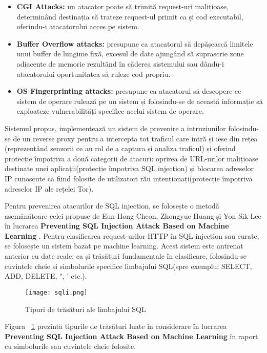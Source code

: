 \begin{itemize}
	\item \textbf{CGI Attacks:}  un atacator poate să trimită request-uri malițioase, determinând destinația să trateze request-ul primit ca și cod executabil, oferindu-i atacatorului acces pe sistem. 
	\item \textbf{Buffer Overflow attacks:}  presupune ca atacatorul să depășească limitele unui buffer de lungime fixă, excesul de date ajungând să suprascrie zone adiacente de memorie rezultând în căderea sistemului sau dându-i atacatorului oportunitatea să ruleze cod propriu. 
	\item \textbf{OS Fingerprinting attacks:}  presupune ca atacatorul să descopere ce sistem de operare rulează pe un sistem și folosindu-se de această informație să exploateze vulnerabilități specifice acelui sistem de operare. 
\end{itemize}

Sistemul propus, \textit{\thesistitle}  implementează un sistem de prevenire a intruziunilor folosindu-se de un reverse proxy pentru a intercepta tot traficul care intră și iese din rețea (reprezentând senzorii ce au rol de a captura și analiza traficul) și oferind protecție împotriva a două categorii de atacuri: oprirea de URL-urilor malițioase destinate unei aplicații(protecție împotriva SQL injection) și blocarea adreselor IP cunoscute ca fiind folosite de utilizatori rău intenționați(protecție împotriva adreselor IP ale rețelei Tor). 

Pentru prevenirea atacurilor de SQL injection, se folosește o metodă asemănătoare celei propuse de Eun Hong Cheon, Zhongyue Huang și Yon Sik Lee în lucrarea  \textbf{Preventing SQL Injection Attack Based on Machine Learning} \cite{sqli_how}. Pentru clasificarea request-urilor HTTP în SQL injection sau curate, se folosește un sistem bazat pe machine learning. Acest sistem este antrenat anterior cu date reale, ca și trăsături fundamentale în clasificare, folosindu-se cuvintele cheie și simbolurile specifice limbajului SQL(spre exemplu: SELECT, ADD, DELETE, ", ' etc.). 

\begin{figure}[h]
\centering
\texttt{[image: sqli.png]}
\caption{ Tipuri de trăsături ale limbajului SQL }
\label{fig:sql-features}
\end{figure}

Figura ~\ref{fig:sql-features}  prezintă tipurile de trăsături luate în considerare în lucrarea \textbf{Preventing SQL Injection Attack Based on Machine Learning} în raport cu simbolurile sau cuvintele cheie folosite.  


